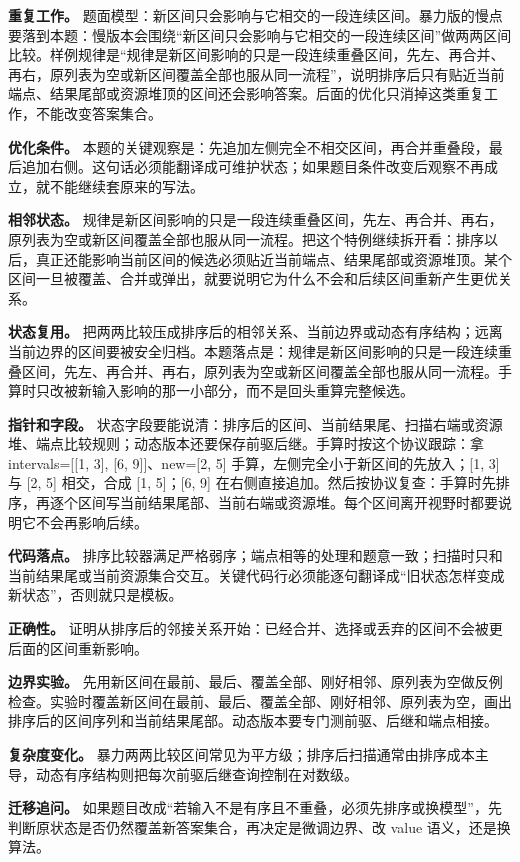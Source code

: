\textbf{重复工作。} 题面模型：新区间只会影响与它相交的一段连续区间。暴力版的慢点要落到本题：慢版本会围绕“新区间只会影响与它相交的一段连续区间”做两两区间比较。样例规律是“规律是新区间影响的只是一段连续重叠区间，先左、再合并、再右，原列表为空或新区间覆盖全部也服从同一流程”，说明排序后只有贴近当前端点、结果尾部或资源堆顶的区间还会影响答案。后面的优化只消掉这类重复工作，不能改变答案集合。

\textbf{优化条件。} 本题的关键观察是：先追加左侧完全不相交区间，再合并重叠段，最后追加右侧。这句话必须能翻译成可维护状态；如果题目条件改变后观察不再成立，就不能继续套原来的写法。

\textbf{相邻状态。} 规律是新区间影响的只是一段连续重叠区间，先左、再合并、再右，原列表为空或新区间覆盖全部也服从同一流程。把这个特例继续拆开看：排序以后，真正还能影响当前区间的候选必须贴近当前端点、结果尾部或资源堆顶。某个区间一旦被覆盖、合并或弹出，就要说明它为什么不会和后续区间重新产生更优关系。

\textbf{状态复用。} 把两两比较压成排序后的相邻关系、当前边界或动态有序结构；远离当前边界的区间要被安全归档。本题落点是：规律是新区间影响的只是一段连续重叠区间，先左、再合并、再右，原列表为空或新区间覆盖全部也服从同一流程。手算时只改被新输入影响的那一小部分，而不是回头重算完整候选。

\textbf{指针和字段。} 状态字段要能说清：排序后的区间、当前结果尾、扫描右端或资源堆、端点比较规则；动态版本还要保存前驱后继。手算时按这个协议跟踪：拿 intervals=[[1, 3], [6, 9]]、new=[2, 5] 手算，左侧完全小于新区间的先放入；[1, 3] 与 [2, 5] 相交，合成 [1, 5]；[6, 9] 在右侧直接追加。然后按协议复查：手算时先排序，再逐个区间写当前结果尾部、当前右端或资源堆。每个区间离开视野时都要说明它不会再影响后续。

\textbf{代码落点。} 排序比较器满足严格弱序；端点相等的处理和题意一致；扫描时只和当前结果尾或当前资源集合交互。关键代码行必须能逐句翻译成“旧状态怎样变成新状态”，否则就只是模板。

\textbf{正确性。} 证明从排序后的邻接关系开始：已经合并、选择或丢弃的区间不会被更后面的区间重新影响。

\textbf{边界实验。} 先用新区间在最前、最后、覆盖全部、刚好相邻、原列表为空做反例检查。实验时覆盖新区间在最前、最后、覆盖全部、刚好相邻、原列表为空，画出排序后的区间序列和当前结果尾部。动态版本要专门测前驱、后继和端点相接。

\textbf{复杂度变化。} 暴力两两比较区间常见为平方级；排序后扫描通常由排序成本主导，动态有序结构则把每次前驱后继查询控制在对数级。

\textbf{迁移追问。} 如果题目改成“若输入不是有序且不重叠，必须先排序或换模型”，先判断原状态是否仍然覆盖新答案集合，再决定是微调边界、改 value 语义，还是换算法。

